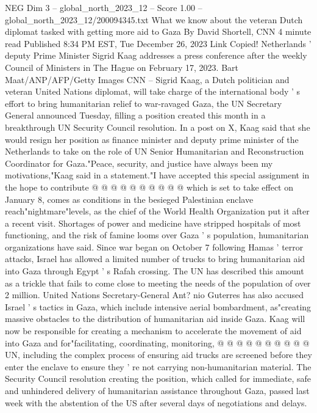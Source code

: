 \begin{textsample}{NEG Dim 3 – global\_north\_2023\_12 – Score 1.00 – global\_north\_2023\_12/200094345.txt}  \label{ex:f3_neg_198}
What we know about the veteran Dutch diplomat tasked with getting more aid to Gaza By David Shortell, CNN 4 minute read Published 8:34 PM EST, Tue December 26, 2023 Link Copied!
Netherlands ' deputy Prime Minister Sigrid Kaag addresses a press conference after the weekly Council of Ministers in The Hague on February 17, 2023.
Bart Maat/ANP/AFP/Getty Images CNN -- Sigrid Kaag, a Dutch politician and veteran United Nations diplomat, will take charge of the international body ' s effort to bring humanitarian relief to war-ravaged Gaza, the UN Secretary General announced Tuesday, filling a position created this month in a breakthrough UN Security Council resolution.
In a post on X, Kaag said that she would resign her position as finance minister and deputy prime minister of the Netherlands to take on the role of UN Senior Humanitarian and Reconstruction Coordinator for Gaza."Peace, security, and justice have always been my motivations,"Kaag said in a statement."I have accepted this special assignment in the hope to contribute @ @ @ @ @ @ @ @ @ @ which is set to take effect on January 8, comes as conditions in the besieged Palestinian enclave reach"nightmare"levels, as the chief of the World Health Organization put it after a recent visit.
Shortages of power and medicine have stripped hospitals of most functioning, and the risk of famine looms over Gaza ' s population, humanitarian organizations have said.
Since war began on October 7 following Hamas ' terror attacks, Israel has allowed a limited number of trucks to bring humanitarian aid into Gaza through Egypt ' s Rafah crossing.
The UN has described this amount as a trickle that fails to come close to meeting the needs of the population of over 2 million.
United Nations Secretary-General Ant? nio Guterres has also accused Israel ' s tactics in Gaza, which include intensive aerial bombardment, as"creating massive obstacles to the distribution of humanitarian aid inside Gaza.
Kaag will now be responsible for creating a mechanism to accelerate the movement of aid into Gaza and for"facilitating, coordinating, monitoring, @ @ @ @ @ @ @ @ @ @ UN, including the complex process of ensuring aid trucks are screened before they enter the enclave to ensure they ' re not carrying non-humanitarian material.
The Security Council resolution creating the position, which called for immediate, safe and unhindered delivery of humanitarian assistance throughout Gaza, passed last week with the abstention of the US after several days of negotiations and delays.

\end{textsample}
